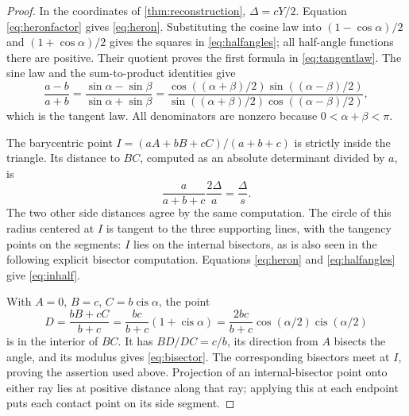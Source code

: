 \documentclass[11pt,letterpaper]{article}
\theoremstyle{definition}
\theoremstyle{remark}
\newcommand{\cis}{\operatorname{cis}}
\numberwithin{equation}{section}
\begin{document}
\begin{proof}
In the coordinates of \cref{thm:reconstruction}, $\Delta=cY/2$. Equation \eqref{eq:heronfactor} gives \eqref{eq:heron}. Substituting the cosine law into $(1-\cos\alpha)/2$ and $(1+\cos\alpha)/2$ gives the squares in \eqref{eq:halfangles}; all half-angle functions there are positive. Their quotient proves the first formula in \eqref{eq:tangentlaw}. The sine law and the sum-to-product identities give
\[
 \frac{a-b}{a+b}
 =\frac{\sin\alpha-\sin\beta}{\sin\alpha+\sin\beta}
 =\frac{\cos((\alpha+\beta)/2)\sin((\alpha-\beta)/2)}
 {\sin((\alpha+\beta)/2)\cos((\alpha-\beta)/2)},
\]
which is the tangent law. All denominators are nonzero because $0<\alpha+\beta<\pi$.

The barycentric point $I=(aA+bB+cC)/(a+b+c)$ is strictly inside the triangle. Its distance to $BC$, computed as an absolute determinant divided by $a$, is
\[
 \frac{a}{a+b+c}\frac{2\Delta}{a}=\frac\Delta s.
\]
The two other side distances agree by the same computation. The circle of this radius centered at $I$ is tangent to the three supporting lines, with the tangency points on the segments: $I$ lies on the internal bisectors, as is also seen in the following explicit bisector computation. Equations \eqref{eq:heron} and \eqref{eq:halfangles} give \eqref{eq:inhalf}.

With $A=0$, $B=c$, $C=b\cis\alpha$, the point
\[
 D=\frac{bB+cC}{b+c}=\frac{bc}{b+c}(1+\cis\alpha)
 =\frac{2bc}{b+c}\cos(\alpha/2)\cis(\alpha/2)
\]
is in the interior of $BC$. It has $BD/DC=c/b$, its direction from $A$ bisects the angle, and its modulus gives \eqref{eq:bisector}. The corresponding bisectors meet at $I$, proving the assertion used above. Projection of an internal-bisector point onto either ray lies at positive distance along that ray; applying this at each endpoint puts each contact point on its side segment.
\end{proof}
\end{document}
